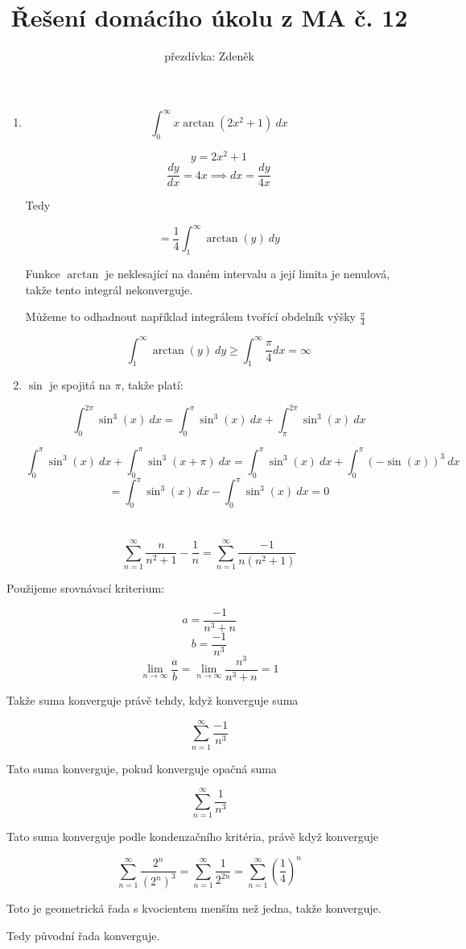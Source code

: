 \documentclass[10pt,a4paper]{article}
\title{Řešení domácího úkolu z MA č. 12}
\author{přezdívka: Zdeněk}
\date{}
\theoremstyle{plain}
\theoremstyle{definition}
\begin{document}
\maketitle

\section{}

\begin{enumerate}[label=(\alph*)]

\item 
\[  \int_0^\infty x\arctan(2x^2+1)\ dx \]

\[ y = 2x^2+1\]
\[ \frac{dy}{dx} = 4x \implies dx = \frac{dy}{4x}   \]

Tedy

\[ =\frac14  \int_1^\infty \arctan(y)\ dy \]

Funkce $\arctan$ je neklesající na daném intervalu a její limita je nenulová, takže tento integrál nekonverguje.

Můžeme to odhadnout například integrálem tvořící obdelník výšky $\frac\pi4$ 

\[ \int_1^\infty \arctan(y)\ dy  \geq \int_1^\infty \frac\pi4  dx = \infty \]


\item

$\sin$ je spojitá na $\pi$, takže platí:

 \[ \int_0^{2\pi} \sin^3(x)\ dx = \int_0^{\pi} \sin^3(x)\ dx + \int_{\pi}^{2\pi} \sin^3(x)\ dx \]
 
 \[ \int_0^{\pi} \sin^3(x)\ dx + \int_{0}^{\pi} \sin^3(x + \pi)\ dx
 = \int_0^{\pi} \sin^3(x)\ dx + \int_{0}^{\pi} (-\sin(x))^3 \ dx \]\[
 = \int_0^{\pi} \sin^3(x)\ dx - \int_{0}^{\pi} \sin^3(x)\ dx = 0 \]
 
\end{enumerate}

\section{}


\[ \sum^\infty_{n=1} \frac{n}{n^2 + 1} - \frac1{n}  =  \sum^\infty_{n=1} \frac{-1}{n(n^2 + 1)} \]


Použijeme srovnávací kriterium:

\[ a =\frac{-1}{n^3 + n}  \]
\[ b =  \frac{-1}{n^3}  \]
\[ \lim_{n \to \infty} \frac{a}{b} = \lim_{n \to \infty} \frac{n^3}{n^3 + n} = 1 \]

Takže suma konverguje právě tehdy, když konverguje suma

\[ \sum^\infty_{n=1} \frac{-1}{n^3}\]

Tato suma konverguje, pokud konverguje opačná suma 

\[ \sum^\infty_{n=1} \frac{1}{n^3}\]

Tato suma konverguje podle kondenzačního kritéria, právě když konverguje

\[ \sum^\infty_{n=1} \frac{2^n}{(2^n)^3} = \sum^\infty_{n=1} \frac{1}{2^{2n}} =  \sum^\infty_{n=1} \left( \frac{1}{4} \right)^n \]

Toto je geometrická řada s kvocientem menším než jedna, takže konverguje.

Tedy původní řada konverguje.
\end{document}
